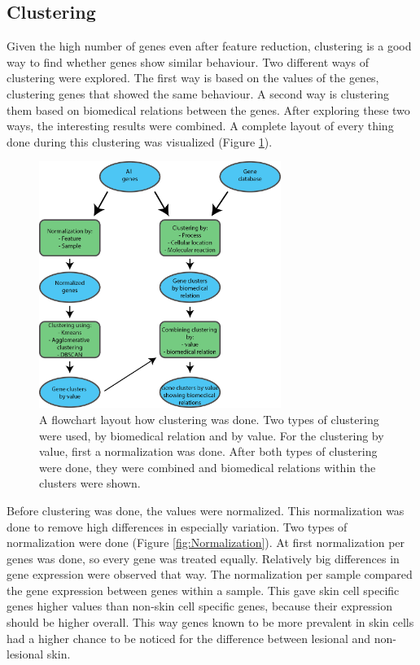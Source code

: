 \documentclass[10pt,a4paper]{article}
\begin{document}
	\subsection{Clustering}
	\label{subsec:MethodsPositionalClustering}
	
	Given the high number of genes even after feature reduction, clustering is a good way to find whether genes show similar behaviour. Two different ways of clustering were explored. The first way is based on the values of the genes, clustering genes that showed the same behaviour. A second way is clustering them based on biomedical relations between the genes. After exploring these two ways, the interesting results were combined. A complete layout of every thing done during this clustering was visualized (Figure \ref{fig:ClusteringLayout}).
	
		\begin{figure}[H]
		\includegraphics[width=0.7\textwidth]{ClusteringLayout.png}
		\caption{A flowchart layout how clustering was done. Two types of clustering were used, by biomedical relation and by value. For the clustering by value, first a normalization was done. After both types of clustering were done, they were combined and biomedical relations within the clusters were shown.}
		\label{fig:ClusteringLayout}
	\end{figure}
	
	Before clustering was done, the values were normalized. This normalization was done to remove high differences in especially variation. Two types of normalization were done (Figure \ref{fig:Normalization}). At first normalization per genes was done, so every gene was treated equally. Relatively big differences in gene expression were observed that way. The normalization per sample compared the gene expression between genes within a sample. This gave skin cell specific genes higher values than non-skin cell specific genes, because their expression should be higher overall. This way genes known to be more prevalent in skin cells had a higher chance to be noticed for the difference between lesional and non-lesional skin.
	
\end{document}
